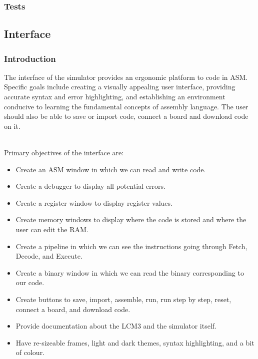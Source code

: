 \documentclass{article}
\begin{document}
\subsubsection{Tests}


\paragraph{}


\newpage
\subsection{Interface}
\subsubsection{Introduction}

The interface of the simulator provides an ergonomic platform to code in ASM.\\
Specific goals include creating a visually appealing user interface, providing accurate syntax and error highlighting, and establishing an environment conducive to learning the fundamental concepts of assembly language. The user should also be able to save or import code, connect a board and download code on it.

\noindent \\Primary objectives of the interface are:

\begin{itemize}
  \item Create an ASM window in which we can read and write code.
  \item Create a debugger to display all potential errors.
  \item Create a register window to display register values.
  \item Create memory windows to display where the code is stored and where the user can edit the RAM.
  \item Create a pipeline in which we can see the instructions going through Fetch, Decode, and Execute.
  \item Create a binary window in which we can read the binary corresponding to our code.
  \item Create buttons to save, import, assemble, run, run step by step, reset, connect a board, and download code.
  \item Provide documentation about the LCM3 and the simulator itself.
  \item Have re-sizeable frames, light and dark themes, syntax highlighting, and a bit of colour.
\end{itemize}
\end{document}
